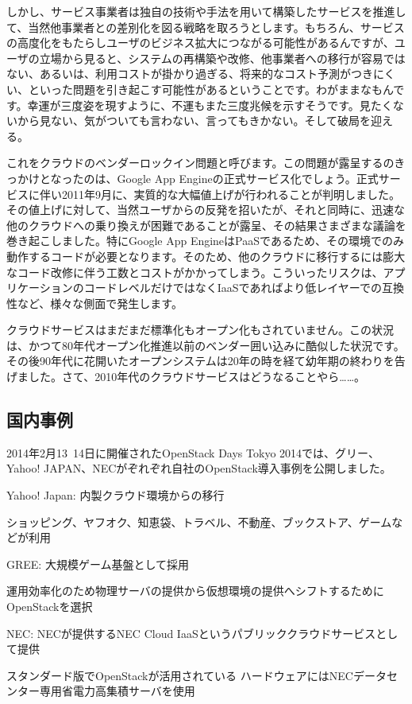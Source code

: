 \documentclass[8pt,b5paper,tombo,openany]{jsbook}
\begin{document}
しかし、サービス事業者は独自の技術や手法を用いて構築したサービスを推進して、当然他事業者との差別化を図る戦略を取ろうとします。もちろん、サービスの高度化をもたらしユーザのビジネス拡大につながる可能性があるんですが、ユーザの立場から見ると、システムの再構築や改修、他事業者への移行が容易ではない、あるいは、利用コストが掛かり過ぎる、将来的なコスト予測がつきにくい、といった問題を引き起こす可能性があるということです。わがままなもんです。幸運が三度姿を現すように、不運もまた三度兆候を示すそうです。見たくないから見ない、気がついても言わない、言ってもきかない。そして破局を迎える。

これをクラウドのベンダーロックイン問題と呼びます。この問題が露呈するのきっかけとなったのは、Google App Engineの正式サービス化でしょう。正式サービスに伴い2011年9月に、実質的な大幅値上げが行われることが判明しました。その値上げに対して、当然ユーザからの反発を招いたが、それと同時に、迅速な他のクラウドへの乗り換えが困難であることが露呈、その結果さまざまな議論を巻き起こしました。特にGoogle App EngineはPaaSであるため、その環境でのみ動作するコードが必要となります。そのため、他のクラウドに移行するには膨大なコード改修に伴う工数とコストがかかってしまう。こういったリスクは、アプリケーションのコードレベルだけではなくIaaSであればより低レイヤーでの互換性など、様々な側面で発生します。

クラウドサービスはまだまだ標準化もオープン化もされていません。この状況は、かつて80年代オープン化推進以前のベンダー囲い込みに酷似した状況です。その後90年代に花開いたオープンシステムは20年の時を経て幼年期の終わりを告げました。さて、2010年代のクラウドサービスはどうなることやら……。

\subsection{国内事例}

2014年2月13~14日に開催されたOpenStack Days Tokyo 2014では、グリー、Yahoo! JAPAN、NECがぞれぞれ自社のOpenStack導入事例を公開しました。

Yahoo! Japan: 内製クラウド環境からの移行

ショッピング、ヤフオク、知恵袋、トラベル、不動産、ブックストア、ゲームなどが利用

GREE: 大規模ゲーム基盤として採用

運用効率化のため物理サーバの提供から仮想環境の提供へシフトするためにOpenStackを選択

NEC: NECが提供するNEC Cloud IaaSというパブリッククラウドサービスとして提供

スタンダード版でOpenStackが活用されている
ハードウェアにはNECデータセンター専用省電力高集積サーバを使用
\end{document}
